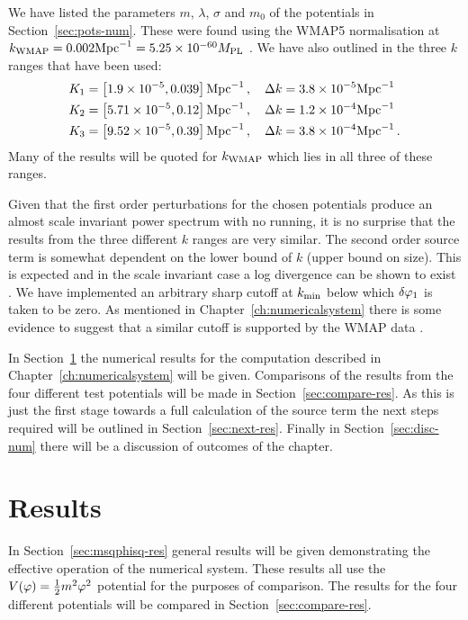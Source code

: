 We have listed the parameters $m$, $\lambda$, $\sigma$ and $m_0$ of the potentials
in Section~\ref{sec:pots-num}. These were found using the WMAP5 normalisation
at $k_\mathrm{WMAP}=0.002 \mathrm{Mpc}^{-1} = 5.25 \times 10^{-60}M_{\mathrm{PL}}$ \cite{Komatsu:2008hk}.
We have also outlined in  the three $k$ ranges that have been
used:
% 
\begin{align*}
K_1 &= \left[1.9\times 10^{-5}, 0.039\right]\mathrm{Mpc}^{-1}\,,\quad \Delta k =
3.8\times 10^{-5}\mathrm{Mpc}^{-1} \nonumber\\
K_2 &= \left[5.71\times 10^{-5}, 0.12\right]\mathrm{Mpc}^{-1}\,, \quad \Delta k =
1.2\times 10^{-4}\mathrm{Mpc}^{-1}
\nonumber\\ 
K_3 &= \left[9.52\times 10^{-5}, 0.39\right]\mathrm{Mpc}^{-1}\,, \quad \Delta k =
3.8\times 10^{-4}\mathrm{Mpc}^{-1} \,.
\end{align*}
Many of the results will be quoted for $k_\mathrm{WMAP}$ which lies in all three of these
ranges.

Given that the first order perturbations for the chosen potentials produce an
almost scale invariant power spectrum with no running, it is no surprise that
the results from the three different $k$ ranges are very similar. The second
order source term is somewhat dependent on the lower bound of $k$ (upper bound
on size). This is expected and in the scale invariant case a log divergence can
be shown to exist \cite{Lyth:2007jh}. We have implemented an arbitrary sharp
cutoff at $k_{\mathrm{min}}$ below which 
$\delta\varphi_{1}$ is taken to be zero. 
As mentioned in Chapter~\ref{ch:numericalsystem} there is some evidence to suggest
that a similar cutoff is supported by the WMAP data \cite{Sinha:2005mn,Kim:2009pf}. 

In Section~\ref{sec:results} the numerical results for the computation described in
Chapter~\ref{ch:numericalsystem} will be given. Comparisons of the results from the
four different test potentials will be made in Section~\ref{sec:compare-res}. As
this is just the first stage towards a full calculation of the source term the next
steps required will be outlined in Section~\ref{sec:next-res}. Finally in
Section~\ref{sec:disc-num} there will be a discussion of outcomes of the chapter.
% 

\section{Results}
\label{sec:results}
In Section~\ref{sec:msqphisq-res} general results will be given demonstrating the
effective operation of the numerical system. These results all use the
$V(\varphi)=\frac{1}{2} m^2 \varphi^2$ potential for the purposes of comparison. The results for the four
different potentials will be compared in Section~\ref{sec:compare-res}.

